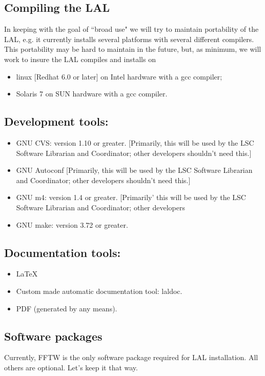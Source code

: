 \documentclass[]{ligodcc}
\begin{document}
\subsection{Compiling the LAL}

In keeping with the goal of ``broad use" we will try to maintain
portability of the LAL, e.g. it currently installs several platforms
with several different compilers.  This portability may be hard to
maintain in the future, but, as minimum, we will work to insure the
LAL compiles and installs on 

\begin{itemize}
\item
linux [Redhat 6.0 or later] on Intel hardware with a gcc compiler;
\item
Solaris 7 on SUN hardware with a gcc compiler.
\end{itemize}

\subsection{Development tools:}

\begin{itemize}
\item
GNU CVS: version 1.10 or greater. [Primarily, this will be
used by the LSC Software Librarian and Coordinator; other developers
shouldn't need this.]
\item
GNU Autoconf [Primarily, this will be used by the LSC Software
Librarian and Coordinator; other developers shouldn't need this.]
\item
GNU m4: version 1.4 or greater. [Primarily' this will be used
by the LSC Software Librarian and Coordinator; other developers
\item
GNU make: version 3.72 or greater.
\end{itemize}


\subsection{Documentation tools:}
\begin{itemize}
   \item
   LaTeX
   \item
   Custom made automatic documentation tool: laldoc.
   \item
   PDF (generated by any means).
\end{itemize}


\subsection{Software packages}
Currently, FFTW is the only software package required for LAL
installation. All others are optional. Let's keep it  that way.
\end{document}
